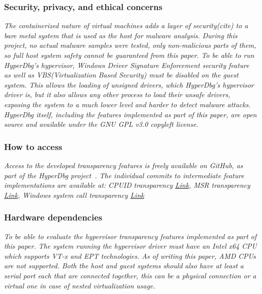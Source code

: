 \subsubsection{Security, privacy, and ethical concerns}
\textit{The containerized nature of virtual machines adds a layer of security(cite) to a bare metal system that is used as the host for malware analysis.
During this project, no actual malware samples were tested, only non-malicious parts of them, so full host system safety cannot be guaranteed from this paper.
To be able to run HyperDbg's hypervisor, Windows Driver Signature Enforcement security feature as well as VBS(Virtualization Based Security) must be disabled on the guest system.
This allows the loading of unsigned drivers, which HyperDbg's hypervisor driver is, but it also allows any other process to load their unsafe drivers, 
exposing the system to a much lower level and harder to detect malware attacks. HyperDbg itself, including the features implemented as part of this paper, are open source and available under the GNU GPL v3.0 copyleft license.}

\subsubsection{How to access}
\textit{Access to the developed transparency features is freely available on GitHub, as part of the HyperDbg project~\cite{hyperdbg}. 
The individual commits to intermediate feature implementations are available at: CPUID transparency \href{https://github.com/HyperDbg/HyperDbg/commit/56c2d400fddca22f314c1e5d16cadce6950eb262}{Link}, 
MSR transparency \href{https://github.com/HyperDbg/HyperDbg/commit/2cc3da3daebd793fd56d5c370ef6da398efa6d29}{Link}, Windows system call
transparency \href{https://github.com/HyperDbg/HyperDbg/commit/d0610661baf944259c33e921d3fc265e6a217ad8}{Link}
}


\subsubsection{Hardware dependencies}
\textit{To be able to evaluate the hypervisor transparency features implemented as part of this paper.
The system running the hypervisor driver must have an Intel x64 CPU which supports VT-x and EPT technologies. As of writing this paper, AMD CPUs are not supported.
Both the host and guest systems should also have at least a serial port each that are connected together, this can be a physical connection or a virtual one in case of nested virtualization usage.}

